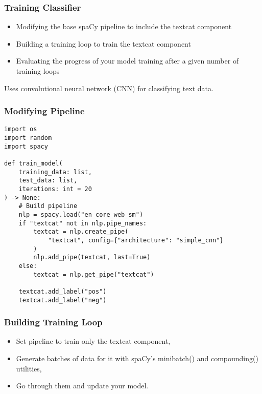 \begin{frame}[fragile]\frametitle{Training Classifier}

\begin{itemize}
\item Modifying the base spaCy pipeline to include the textcat component
\item Building a training loop to train the textcat component
\item Evaluating the progress of your model training after a given number of training loops
\end{itemize}

Uses convolutional neural network (CNN) for classifying text data.


\end{frame}

\begin{frame}[fragile]\frametitle{Modifying Pipeline }

\begin{lstlisting}
import os
import random
import spacy

def train_model(
    training_data: list,
    test_data: list,
    iterations: int = 20
) -> None:
    # Build pipeline
    nlp = spacy.load("en_core_web_sm")
    if "textcat" not in nlp.pipe_names:
        textcat = nlp.create_pipe(
            "textcat", config={"architecture": "simple_cnn"}
        )
        nlp.add_pipe(textcat, last=True)	
    else:
        textcat = nlp.get_pipe("textcat")

    textcat.add_label("pos")
    textcat.add_label("neg")				
\end{lstlisting}

\end{frame}

\begin{frame}[fragile]\frametitle{Building Training Loop }

\begin{itemize}
\item Set pipeline to train only the textcat component, 
\item Generate batches of data for it with spaCy’s minibatch() and compounding() utilities, 
\item Go through them and update your model.
\end{itemize}

\end{frame}

